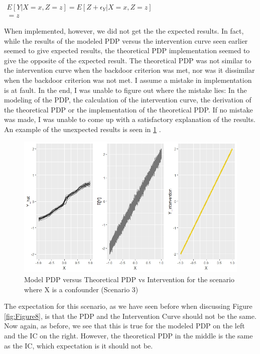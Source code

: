 \documentclass[
]{krantz}
\begin{document}
\(\begin{aligned} E[Y|X = x, Z = z] = E[Z + \epsilon_Y| X = x, Z = z]\\ = z \end{aligned}\)

When implemented, however, we did not get the the expected results. In fact, while the results of the modeled PDP versus the intervention curve seen earlier seemed to give expected results, the theoretical PDP implementation seemed to give the opposite of the expected result. The theoretical PDP was not similar to the intervention curve when the backdoor criterion was met, nor was it dissimilar when the backdoor criterion was not met.
I assume a mistake in implementation is at fault. In the end, I was unable to figure out where the mistake lies: In the modeling of the PDP, the calculation of the intervention curve, the derivation of the theoretical PDP or the implementation of the theoretical PDP. If no mistake was made, I was unable to come up with a satisfactory explanation of the results. An example of the unexpected results is seen in \ref{fig:Figure13causal} .

\begin{figure}

\includegraphics[width=1\linewidth]{images/theoretical_pdp} \hfill{}

\caption{Model PDP versus Theoretical PDP vs Intervention for the scenario where X is a confounder (Scenario 3)}\label{fig:Figure13causal}
\end{figure}

The expectation for this scenario, as we have seen before when discussing Figure \ref{fig:Figure8}, is that the PDP and the Intervention Curve should not be the same. Now again, as before, we see that this is true for the modeled PDP on the left and the IC on the right. However, the theoretical PDP in the middle is the same as the IC, which expectation is it should not be.
\end{document}
